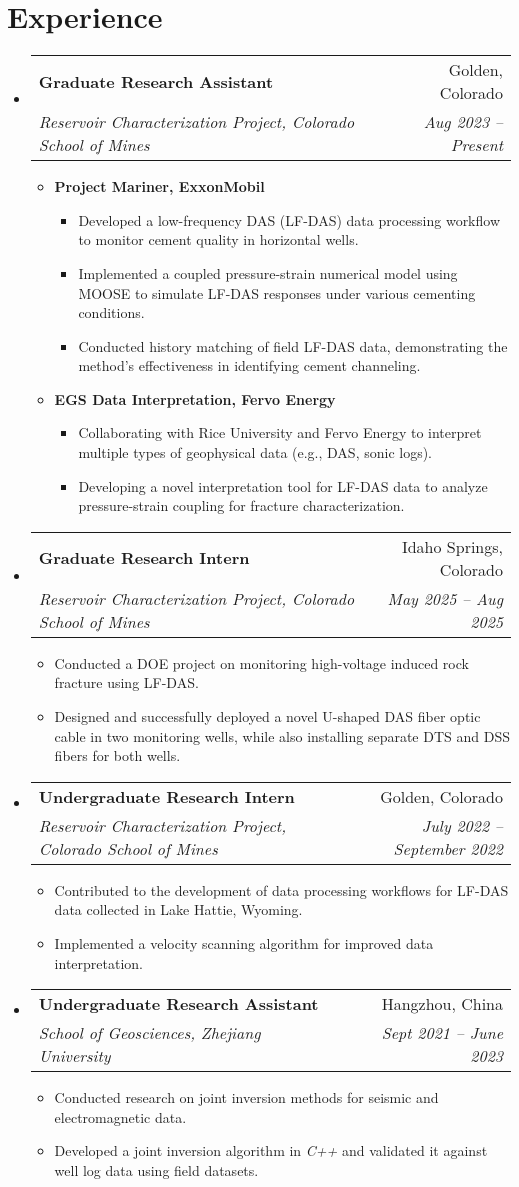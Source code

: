 \documentclass[letterpaper,13pt]{article}
\makeatletter
\newcommand{\resumeItem}[1]{\item\small{{#1 \vspace{-2pt}}}}
\newcommand{\resumeSubheading}[4]{
  \vspace{-2pt}\item
    \begin{tabular*}{0.97\textwidth}[t]{l@{\extracolsep{\fill}}r}
      \textbf{#1} & #2 \\
      \textit{\small#3} & \textit{\small #4} \\
    \end{tabular*}\vspace{-7pt}
}
\newcommand{\resumeItemListStart}{\begin{itemize}[label={\small$\bullet$}]}
\newcommand{\resumeItemListEnd}{\end{itemize}\vspace{-5pt}}
\newcommand{\resumeSubHeadingListStart}{\begin{itemize}[leftmargin=0.15in, label={}]}
\newcommand{\resumeSubHeadingListEnd}{\end{itemize}}
\makeatother
\begin{document}
\section{Experience}
\resumeSubHeadingListStart
\resumeSubheading
  {Graduate Research Assistant}{Golden, Colorado}
  {Reservoir Characterization Project, Colorado School of Mines}{Aug 2023 -- Present}
  \resumeItemListStart
    \resumeItem{\textbf{Project Mariner, ExxonMobil}}
      \resumeItemListStart
        \resumeItem{Developed a low-frequency DAS (LF-DAS) data processing workflow to monitor cement quality in horizontal wells.}
        \resumeItem{Implemented a coupled pressure-strain numerical model using MOOSE to simulate LF-DAS responses under various cementing conditions.}
        \resumeItem{Conducted history matching of field LF-DAS data, demonstrating the method's effectiveness in identifying cement channeling.}
      \resumeItemListEnd

      \resumeItem{\textbf{EGS Data Interpretation, Fervo Energy}}
      \resumeItemListStart
        \resumeItem{Collaborating with Rice University and Fervo Energy to interpret multiple types of geophysical data (e.g., DAS, sonic logs).}
        \resumeItem{Developing a novel interpretation tool for LF-DAS data to analyze pressure-strain coupling for fracture characterization.}
      \resumeItemListEnd

  \resumeItemListEnd

\resumeSubheading
  {Graduate Research Intern}{Idaho Springs, Colorado}
  {Reservoir Characterization Project, Colorado School of Mines}{May 2025 -- Aug 2025}
  \resumeItemListStart
    \resumeItem{Conducted a DOE project on monitoring high-voltage induced rock fracture using LF-DAS.}
    \resumeItem{Designed and successfully deployed a novel U-shaped DAS fiber optic cable in two monitoring wells, while also installing separate DTS and DSS fibers for both wells.}
  \resumeItemListEnd

\resumeSubheading
  {Undergraduate Research Intern}{Golden, Colorado}
  {Reservoir Characterization Project, Colorado School of Mines}{July 2022 -- September 2022}
  \resumeItemListStart
    \resumeItem{Contributed to the development of data processing workflows for LF-DAS data collected in Lake Hattie, Wyoming.}
    \resumeItem{Implemented a velocity scanning algorithm for improved data interpretation.}
  \resumeItemListEnd

\resumeSubheading
  {Undergraduate Research Assistant}{Hangzhou, China}
  {School of Geosciences, Zhejiang University}{Sept 2021 -- June 2023}
  \resumeItemListStart
    \resumeItem{Conducted research on joint inversion methods for seismic and electromagnetic data.}
    \resumeItem{Developed a joint inversion algorithm in \textit{C++} and validated it against well log data using field datasets.}
  \resumeItemListEnd
\resumeSubHeadingListEnd
\end{document}
